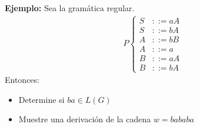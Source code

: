 \textbf{Ejemplo: }Sea la gramática regular.
\begin{align*}
P\left\{\begin{array}{rl}
S&::=aA	\\	
S&::=bA	\\
A&::=bB	\\
A&::=a	\\
B&::=aA	\\
B&::=bA		
\end{array}\right.
\end{align*}
Entonces:
\begin{itemize}
\item Determine si $ba\in L(G)$
\item Muestre una derivación de la cadena $w=bababa$
\end{itemize}